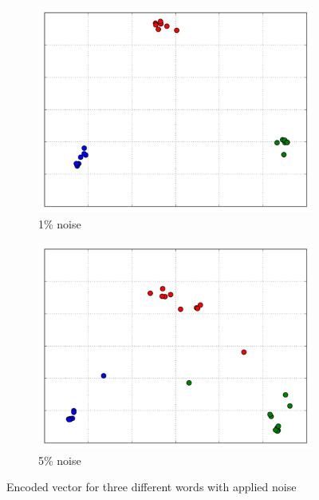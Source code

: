 \begin{figure}[!ht]
    \centering
    \begin{subfigure}{.5\textwidth}
        \centering
        \includegraphics[width=.9\linewidth]{fig/results/context_vector.png}
        \caption{1\% noise}
        \label{fig:context_vector_plot_1}
    \end{subfigure}%
    \begin{subfigure}{.5\textwidth}
        \centering
        \includegraphics[width=.9\linewidth]{fig/results/context_vector2.png}
        \caption{5\% noise}
        \label{fig:context_vector_plot_5}
    \end{subfigure}
    \captionsetup{justification=centering}
    \caption{Encoded vector for three different words with applied noise}
    \label{fig:context_vector_plot}
\end{figure}

